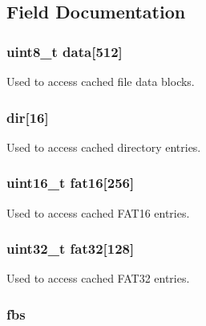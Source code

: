 \subsection{Field Documentation}
\hypertarget{unioncache__t_a3d71d6f767b902517cdc2a90b93d93ef}{
\subsubsection[{data}]{\setlength{\rightskip}{0pt plus 5cm}uint8\-\_\-t data\mbox{[}512\mbox{]}}}\label{unioncache__t_a3d71d6f767b902517cdc2a90b93d93ef}
Used to access cached file data blocks. \hypertarget{unioncache__t_a6d2e24ad404317d817f7691495f9fa5b}{
\subsubsection[{dir}]{ dir\mbox{[}16\mbox{]}}}\label{unioncache__t_a6d2e24ad404317d817f7691495f9fa5b}
Used to access cached directory entries. \hypertarget{unioncache__t_afbc2aee9e685ba2ec0b2a3e4cfbaefed}{
\subsubsection[{fat16}]{\setlength{\rightskip}{0pt plus 5cm}uint16\-\_\-t fat16\mbox{[}256\mbox{]}}}\label{unioncache__t_afbc2aee9e685ba2ec0b2a3e4cfbaefed}
Used to access cached F\-A\-T16 entries. \hypertarget{unioncache__t_ae7eca49d4c578b2d41d0ca2edfa65a11}{
\subsubsection[{fat32}]{\setlength{\rightskip}{0pt plus 5cm}uint32\-\_\-t fat32\mbox{[}128\mbox{]}}}\label{unioncache__t_ae7eca49d4c578b2d41d0ca2edfa65a11}
Used to access cached F\-A\-T32 entries. \hypertarget{unioncache__t_af7dac1f364d9df2fab1065761459085a}{
\subsubsection[{fbs}]{ fbs}}\label{unioncache__t_af7dac1f364d9df2fab1065761459085a}
